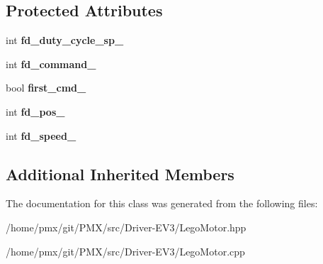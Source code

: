 \subsection*{Protected Attributes}
\begin{DoxyCompactItemize}
\item 
\mbox{\label{classLegoMotor_ab6c40af1c31e453962490dbdfad3bd47}} 
int {\bfseries fd\+\_\+duty\+\_\+cycle\+\_\+sp\+\_\+}
\item 
\mbox{\label{classLegoMotor_a25aafff15e29aacbfb846ebdcb91b3f3}} 
int {\bfseries fd\+\_\+command\+\_\+}
\item 
\mbox{\label{classLegoMotor_a8382224a452ff77ba8e6ca1ff25f183b}} 
bool {\bfseries first\+\_\+cmd\+\_\+}
\item 
\mbox{\label{classLegoMotor_a5f66f7d781e49cd6a13c52e1efc3dede}} 
int {\bfseries fd\+\_\+pos\+\_\+}
\item 
\mbox{\label{classLegoMotor_a91f5732c5048ee0ba6281fd9c0298e0d}} 
int {\bfseries fd\+\_\+speed\+\_\+}
\end{DoxyCompactItemize}
\subsection*{Additional Inherited Members}


The documentation for this class was generated from the following files\+:\begin{DoxyCompactItemize}
\item 
/home/pmx/git/\+P\+M\+X/src/\+Driver-\/\+E\+V3/Lego\+Motor.\+hpp\item 
/home/pmx/git/\+P\+M\+X/src/\+Driver-\/\+E\+V3/Lego\+Motor.\+cpp\end{DoxyCompactItemize}

